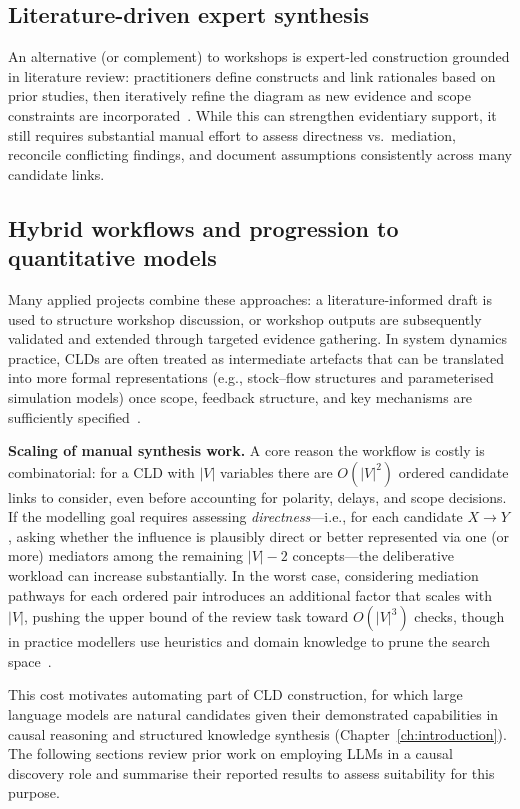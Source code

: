 \subsection{Literature-driven expert synthesis}
An alternative (or complement) to workshops is expert-led construction grounded in literature review: practitioners define constructs and link rationales based on prior studies, then iteratively refine the diagram as new evidence and scope constraints are incorporated~\citep{richardson1986problemscld,crielaard2024refining}. While this can strengthen evidentiary support, it still requires substantial manual effort to assess directness vs.\ mediation, reconcile conflicting findings, and document assumptions consistently across many candidate links.

\subsection{Hybrid workflows and progression to quantitative models}
Many applied projects combine these approaches: a literature-informed draft is used to structure workshop discussion, or workshop outputs are subsequently validated and extended through targeted evidence gathering. In system dynamics practice, CLDs are often treated as intermediate artefacts that can be translated into more formal representations (e.g., stock--flow structures and parameterised simulation models) once scope, feedback structure, and key mechanisms are sufficiently specified~\citep{sterman2002system}.

\medskip
\noindent\textbf{Scaling of manual synthesis work.} A core reason the workflow is costly is combinatorial: for a CLD with \(|V|\) variables there are \(O(|V|^2)\) ordered candidate links to consider, even before accounting for polarity, delays, and scope decisions. If the modelling goal requires assessing \emph{directness}---i.e., for each candidate \(X \rightarrow Y\), asking whether the influence is plausibly direct or better represented via one (or more) mediators among the remaining \(|V|-2\) concepts---the deliberative workload can increase substantially. In the worst case, considering mediation pathways for each ordered pair introduces an additional factor that scales with \(|V|\), pushing the upper bound of the review task toward \(O(|V|^3)\) checks, though in practice modellers use heuristics and domain knowledge to prune the search space~\citep{richardson1986problemscld,crielaard2024refining}.

This cost motivates automating part of CLD construction, for which large language models are natural candidates given their demonstrated capabilities in causal reasoning and structured knowledge synthesis (Chapter~\ref{ch:introduction}). The following sections review prior work on employing LLMs in a causal discovery role and summarise their reported results to assess suitability for this purpose.


